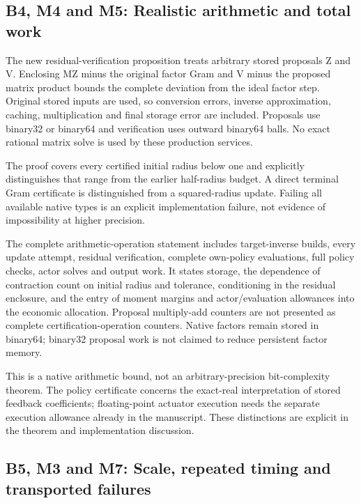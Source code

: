 \documentclass[
  11pt,
]{article}
\begin{document}
\hypertarget{b4-m4-and-m5-realistic-arithmetic-and-total-work}{%
\subsection{B4, M4 and M5: Realistic arithmetic and total
work}\label{b4-m4-and-m5-realistic-arithmetic-and-total-work}}

The new residual-verification proposition treats arbitrary stored
proposals Z and V. Enclosing MZ minus the original factor Gram and V
minus the proposed matrix product bounds the complete deviation from the
ideal factor step. Original stored inputs are used, so conversion
errors, inverse approximation, caching, multiplication and final storage
error are included. Proposals use binary32 or binary64 and verification
uses outward binary64 balls. No exact rational matrix solve is used by
these production services.

The proof covers every certified initial radius below one and explicitly
distinguishes that range from the earlier half-radius budget. A direct
terminal Gram certificate is distinguished from a squared-radius update.
Failing all available native types is an explicit implementation
failure, not evidence of impossibility at higher precision.

The complete arithmetic-operation statement includes target-inverse
builds, every update attempt, residual verification, complete own-policy
evaluations, full policy checks, actor solves and output work. It states
storage, the dependence of contraction count on initial radius and
tolerance, conditioning in the residual enclosure, and the entry of
moment margins and actor/evaluation allowances into the economic
allocation. Proposal multiply-add counters are not presented as complete
certification-operation counters. Native factors remain stored in
binary64; binary32 proposal work is not claimed to reduce persistent
factor memory.

This is a native arithmetic bound, not an arbitrary-precision
bit-complexity theorem. The policy certificate concerns the exact-real
interpretation of stored feedback coefficients; floating-point actuator
execution needs the separate execution allowance already in the
manuscript. These distinctions are explicit in the theorem and
implementation discussion.

\hypertarget{b5-m3-and-m7-scale-repeated-timing-and-transported-failures}{%
\subsection{B5, M3 and M7: Scale, repeated timing and transported
failures}\label{b5-m3-and-m7-scale-repeated-timing-and-transported-failures}}
\end{document}

